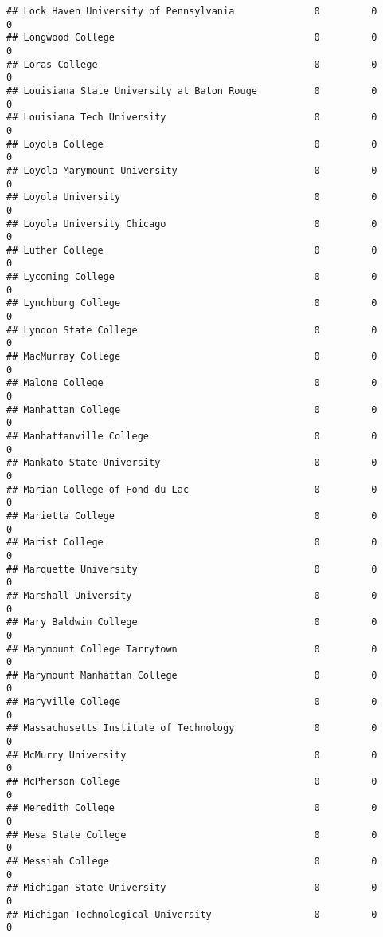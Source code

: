 \documentclass[
]{article}
\begin{document}
\begin{verbatim}
## Lock Haven University of Pennsylvania              0         0         0
## Longwood College                                   0         0         0
## Loras College                                      0         0         0
## Louisiana State University at Baton Rouge          0         0         0
## Louisiana Tech University                          0         0         0
## Loyola College                                     0         0         0
## Loyola Marymount University                        0         0         0
## Loyola University                                  0         0         0
## Loyola University Chicago                          0         0         0
## Luther College                                     0         0         0
## Lycoming College                                   0         0         0
## Lynchburg College                                  0         0         0
## Lyndon State College                               0         0         0
## MacMurray College                                  0         0         0
## Malone College                                     0         0         0
## Manhattan College                                  0         0         0
## Manhattanville College                             0         0         0
## Mankato State University                           0         0         0
## Marian College of Fond du Lac                      0         0         0
## Marietta College                                   0         0         0
## Marist College                                     0         0         0
## Marquette University                               0         0         0
## Marshall University                                0         0         0
## Mary Baldwin College                               0         0         0
## Marymount College Tarrytown                        0         0         0
## Marymount Manhattan College                        0         0         0
## Maryville College                                  0         0         0
## Massachusetts Institute of Technology              0         0         0
## McMurry University                                 0         0         0
## McPherson College                                  0         0         0
## Meredith College                                   0         0         0
## Mesa State College                                 0         0         0
## Messiah College                                    0         0         0
## Michigan State University                          0         0         0
## Michigan Technological University                  0         0         0

\end{verbatim}
\end{document}
